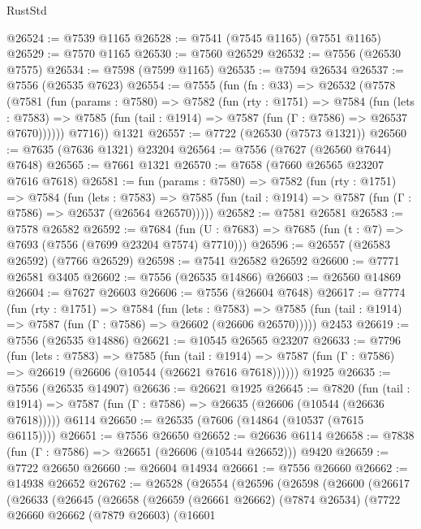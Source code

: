 \begin{lexlean}{RustStd}
\begin{coremodule}
@26524 := @7539 @1165
@26528 := @7541 (@7545 @1165) (@7551 @1165)
@26529 := @7570 @1165
@26530 := @7560 @26529
@26532 := @7556 (@26530 @7575)
@26534 := @7598 (@7599 @1165)
@26535 := @7594 @26534
@26537 := @7556 (@26535 @7623)
@26554 := @7555
    (fun (fn : @33) =>
    @26532
      (@7578
        (@7581
          (fun (params : @7580) =>
          @7582
            (fun (rty : @1751) =>
            @7584
              (fun (lets : @7583) =>
              @7585 (fun (tail : @1914) => @7587 (fun (Γ : @7586) => @26537 @7670))))))
        @7716))
    @1321
@26557 := @7722 (@26530 (@7573 @1321))
@26560 := @7635 (@7636 @1321) @23204
@26564 := @7556 (@7627 (@26560 @7644) @7648)
@26565 := @7661 @1321
@26570 := @7658 (@7660 @26565 @23207 @7616 @7618)
@26581 := fun (params : @7580) =>
  @7582
    (fun (rty : @1751) =>
    @7584
      (fun (lets : @7583) =>
      @7585 (fun (tail : @1914) => @7587 (fun (Γ : @7586) => @26537 (@26564 @26570)))))
@26582 := @7581 @26581
@26583 := @7578 @26582
@26592 := @7684
    (fun (U : @7683) => @7685 (fun (t : @7) => @7693 (@7556 (@7699 @23204 @7574) @7710)))
@26596 := @26557 (@26583 @26592) (@7766 @26529)
@26598 := @7541 @26582 @26592
@26600 := @7771 @26581 @3405
@26602 := @7556 (@26535 @14866)
@26603 := @26560 @14869
@26604 := @7627 @26603
@26606 := @7556 (@26604 @7648)
@26617 := @7774
    (fun (rty : @1751) =>
    @7584
      (fun (lets : @7583) =>
      @7585 (fun (tail : @1914) => @7587 (fun (Γ : @7586) => @26602 (@26606 @26570)))))
    @2453
@26619 := @7556 (@26535 @14886)
@26621 := @10545 @26565 @23207
@26633 := @7796
    (fun (lets : @7583) =>
    @7585
      (fun (tail : @1914) =>
      @7587 (fun (Γ : @7586) => @26619 (@26606 (@10544 (@26621 @7616 @7618))))))
    @1925
@26635 := @7556 (@26535 @14907)
@26636 := @26621 @1925
@26645 := @7820
    (fun (tail : @1914) => @7587 (fun (Γ : @7586) => @26635 (@26606 (@10544 (@26636 @7618)))))
    @6114
@26650 := @26535 (@7606 (@14864 (@10537 (@7615 @6115))))
@26651 := @7556 @26650
@26652 := @26636 @6114
@26658 := @7838 (fun (Γ : @7586) => @26651 (@26606 (@10544 @26652))) @9420
@26659 := @7722 @26650
@26660 := @26604 @14934
@26661 := @7556 @26660
@26662 := @14938 @26652
@26762 := @26528
    (@26554
      (@26596
        (@26598
          (@26600
            (@26617
              (@26633
                (@26645
                  (@26658
                    (@26659
                      (@26661 @26662)
                      (@7874 @26534)
                      (@7722
                        @26660
                        @26662
                        (@7879 @26603)
                        (@16601

\end{coremodule}
\end{lexlean}
